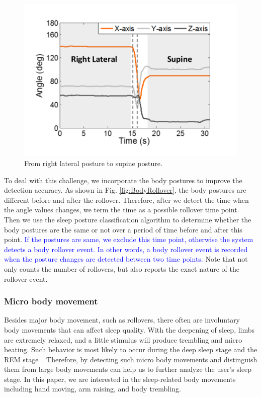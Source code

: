 \begin{figure}[!t]
\begin{minipage}[t]{0.31\linewidth}
    \includegraphics[width=0.97\linewidth]{Figures/RightToSupine.pdf}\centering
  \caption{From right lateral posture to supine posture.}\label{fig:RightToLeft}
\end{minipage}
\end{figure}

To deal with this challenge, we incorporate the body postures to improve the detection accuracy. As shown in Fig. \ref{fig:BodyRollover}, the body postures are different before and after the rollover. Therefore, after we detect the time when the angle values changes, we term the time as a possible rollover time point. Then we use the sleep posture classification algorithm to determine whether the body postures are the same or not over a period of time before and after this point. \textcolor{blue}{If the postures are same, we exclude this time point, otherwise the system detects a body rollover event. In other words, a body rollover event is recorded when the posture changes
are detected between two time points.} Note that {\systemname} not only counts the number of rollovers, but also reports the exact nature of the rollover event.


\subsubsection{Micro body movement \label{sec:microbo}}

Besides major body movement, such as rollovers, there often are involuntary body movements that can affect sleep quality. With the deepening of sleep, limbs are extremely relaxed, and a little stimulus will produce trembling and micro beating. Such behavior is most likely to occur during the deep sleep stage and the REM stage~\cite{ancoli2003role,Jean2000Sleep}. Therefore, by detecting such micro body movements and distinguish them from large body movements can help us to further analyze the user's sleep stage. In this paper, we are interested in the sleep-related body movements including hand moving, arm raising, and body trembling.

